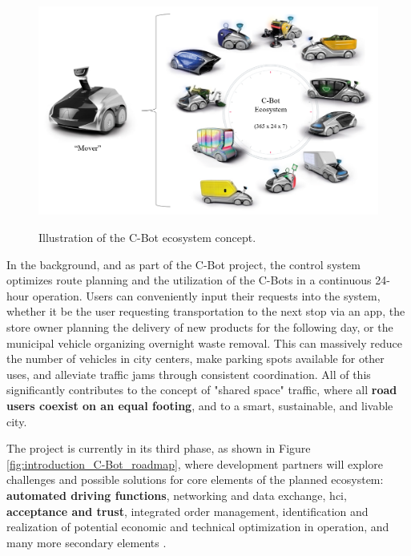 \begin{figure}[htbp]
    \raggedright
        \caption{Illustration of the C-Bot ecosystem concept.}
        \includegraphics[width=1\textwidth]{resources/images/020-introduction/Introduction_context_C-Bot.png}
        \label{fig:introduction_C-Bot_ecosystem}
\end{figure} 

In the background, and as part of the C-Bot project, the control system optimizes route planning and the utilization of the C-Bots in a continuous 24-hour operation. Users can conveniently input their requests into the system, whether it be the user requesting transportation to the next stop via an app, the store owner planning the delivery of new products for the following day, or the municipal vehicle organizing overnight waste removal. This can massively reduce the number of vehicles in city centers, make parking spots available for other uses, and alleviate traffic jams through consistent coordination. All of this significantly contributes to the concept of "shared space" traffic, where all \textbf{road users coexist on an equal footing}, and to a smart, sustainable, and livable city.

The project is currently in its third phase, as shown in Figure \ref{fig:introduction_C-Bot_roadmap}, where development partners will explore challenges and possible solutions for core elements of the planned ecosystem: \textbf{automated driving functions}, networking and data exchange, \gls{hci}, \textbf{acceptance and trust}, integrated order management, identification and realization of potential economic and technical optimization in operation, and many more secondary elements \cite{EDAG2020}. 

